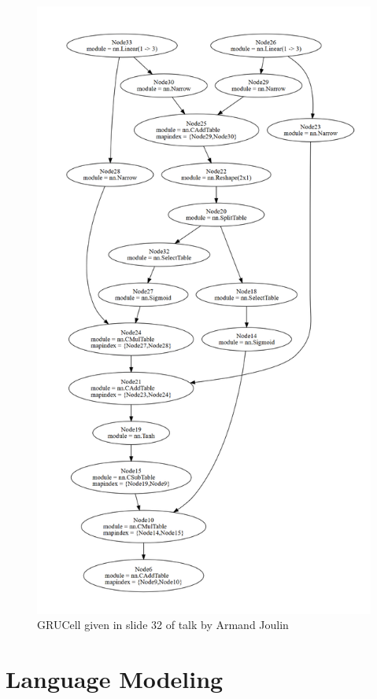 \documentclass{article}
\begin{document}
\begin{figure}[ht!]
  \centering
  \includegraphics[height=1\textheight]{true}
  \caption{GRUCell given in slide 32 of talk by Armand Joulin\label{fig:gru_cell}}
\end{figure}

\section{Language Modeling}
\end{document}
